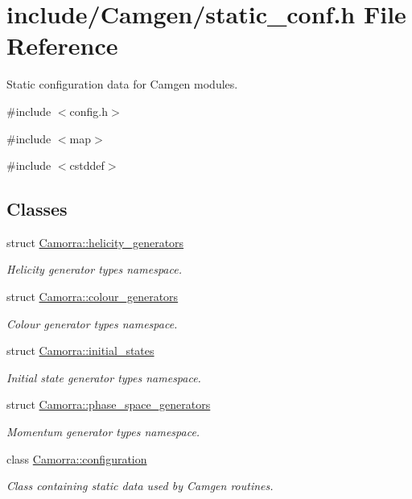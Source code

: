 \hypertarget{a00598}{
\section{include/Camgen/static\_\-conf.h File Reference}
\label{a00598}
}


Static configuration data for Camgen modules.  


{\ttfamily \#include $<$config.h$>$}\par
{\ttfamily \#include $<$map$>$}\par
{\ttfamily \#include $<$cstddef$>$}\par
\subsection*{Classes}
\begin{DoxyCompactItemize}
\item 
struct \hyperlink{a00249}{Camorra::helicity\_\-generators}
\begin{DoxyCompactList}\small\item\em Helicity generator types namespace. \end{DoxyCompactList}\item 
struct \hyperlink{a00079}{Camorra::colour\_\-generators}
\begin{DoxyCompactList}\small\item\em Colour generator types namespace. \end{DoxyCompactList}\item 
struct \hyperlink{a00285}{Camorra::initial\_\-states}
\begin{DoxyCompactList}\small\item\em Initial state generator types namespace. \end{DoxyCompactList}\item 
struct \hyperlink{a00384}{Camorra::phase\_\-space\_\-generators}
\begin{DoxyCompactList}\small\item\em Momentum generator types namespace. \end{DoxyCompactList}\item 
class \hyperlink{a00091}{Camorra::configuration}
\begin{DoxyCompactList}\small\item\em Class containing static data used by Camgen routines. \end{DoxyCompactList}\end{DoxyCompactItemize}
